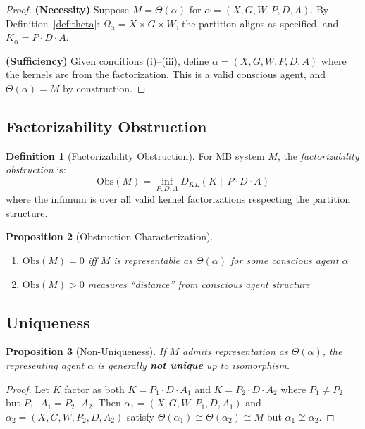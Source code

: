 \documentclass[11pt,a4paper]{article}
\theoremstyle{definition}
\newtheorem{definition}{Definition}[section]
\theoremstyle{plain}
\newtheorem{proposition}[definition]{Proposition}
\theoremstyle{remark}
\begin{document}
\begin{proof}
\textbf{(Necessity)} Suppose $M = \Theta(\alpha)$ for $\alpha = (X, G, W, P, D, A)$. By Definition~\ref{def:theta}: $\Omega_\alpha = X \times G \times W$, the partition aligns as specified, and $K_\alpha = P \cdot D \cdot A$.

\textbf{(Sufficiency)} Given conditions (i)--(iii), define $\alpha = (X, G, W, P, D, A)$ where the kernels are from the factorization. This is a valid conscious agent, and $\Theta(\alpha) = M$ by construction.
\end{proof}

\subsection{Factorizability Obstruction}

\begin{definition}[Factorizability Obstruction]\label{def:factorizability-obstruction}
For MB system $M$, the \emph{factorizability obstruction} is:
\[
\text{Obs}(M) = \inf_{P, D, A} D_{KL}(K \| P \cdot D \cdot A)
\]
where the infimum is over all valid kernel factorizations respecting the partition structure.
\end{definition}

\begin{proposition}[Obstruction Characterization]
\begin{enumerate}[label=(\roman*)]
    \item $\text{Obs}(M) = 0$ iff $M$ is representable as $\Theta(\alpha)$ for some conscious agent $\alpha$
    \item $\text{Obs}(M) > 0$ measures ``distance'' from conscious agent structure
\end{enumerate}
\end{proposition}

\subsection{Uniqueness}

\begin{proposition}[Non-Uniqueness]\label{prop:non-uniqueness}
If $M$ admits representation as $\Theta(\alpha)$, the representing agent $\alpha$ is generally \textbf{not unique} up to isomorphism.
\end{proposition}

\begin{proof}
Let $K$ factor as both $K = P_1 \cdot D \cdot A_1$ and $K = P_2 \cdot D \cdot A_2$ where $P_1 \neq P_2$ but $P_1 \cdot A_1 = P_2 \cdot A_2$. Then $\alpha_1 = (X, G, W, P_1, D, A_1)$ and $\alpha_2 = (X, G, W, P_2, D, A_2)$ satisfy $\Theta(\alpha_1) \cong \Theta(\alpha_2) \cong M$ but $\alpha_1 \not\cong \alpha_2$.
\end{proof}
\end{document}
